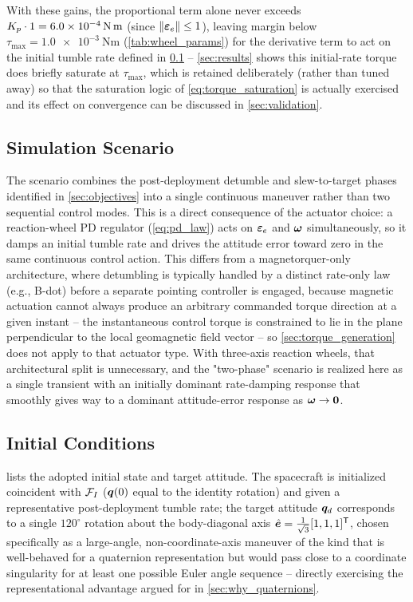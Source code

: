 With these gains, the proportional term alone never exceeds $K_{p}\cdot1 = \SI{6.0e-4}{\newton\meter}$ (since $\left\lVert \bm{\varepsilon}_e \right\rVert\leq1$), leaving margin below $\tau_{\max}=\SI{1.0e-3}{\newton\meter}$ (\cref{tab:wheel_params}) for the derivative term to act on the initial tumble rate defined in \cref{sec:scenario} -- \cref{sec:results} shows this initial-rate torque does briefly saturate at $\tau_{\max}$, which is retained deliberately (rather than tuned away) so that the saturation logic of \cref{eq:torque_saturation} is actually exercised and its effect on convergence can be discussed in \cref{sec:validation}.

\subsection{Simulation Scenario}
\label{sec:scenario}

The scenario combines the post-deployment detumble and slew-to-target phases identified in \cref{sec:objectives} into a single continuous maneuver rather than two sequential control modes. This is a direct consequence of the actuator choice: a reaction-wheel PD regulator (\cref{eq:pd_law}) acts on $\bm{\varepsilon}_e$ and $\bm{\omega}$ simultaneously, so it damps an initial tumble rate and drives the attitude error toward zero in the same continuous control action. This differs from a magnetorquer-only architecture, where detumbling is typically handled by a distinct rate-only law (e.g., B-dot) before a separate pointing controller is engaged, because magnetic actuation cannot always produce an arbitrary commanded torque direction at a given instant -- the instantaneous control torque is constrained to lie in the plane perpendicular to the local geomagnetic field vector \cite{wisniewski1999} -- so \cref{sec:torque_generation} does not apply to that actuator type. With three-axis reaction wheels, that architectural split is unnecessary, and the "two-phase" scenario is realized here as a single transient with an initially dominant rate-damping response that smoothly gives way to a dominant attitude-error response as $\bm{\omega}\to\bm{0}$.

\subsection{Initial Conditions}
\label{sec:initial_conditions}

 lists the adopted initial state and target attitude. The spacecraft is initialized coincident with $\mathcal{F}_I$ ($\bm{q}(0)$ equal to the identity rotation) and given a representative post-deployment tumble rate; the target attitude $\bm{q}_d$ corresponds to a single $120^\circ$ rotation about the body-diagonal axis $\hat{\bm{e}} = \tfrac{1}{\sqrt{3}}[1,1,1]^{\mathsf{T}}$, chosen specifically as a large-angle, non-coordinate-axis maneuver of the kind that is well-behaved for a quaternion representation but would pass close to a coordinate singularity for at least one possible Euler angle sequence -- directly exercising the representational advantage argued for in \cref{sec:why_quaternions}.

